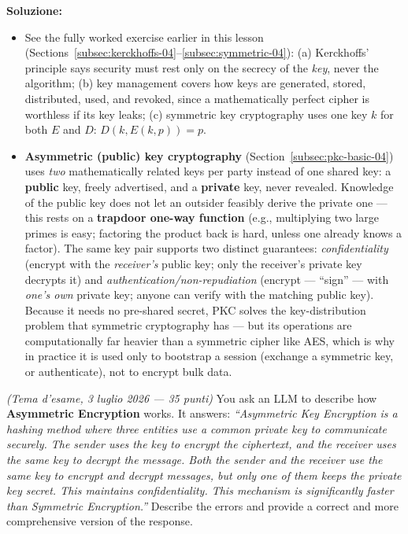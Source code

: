 \documentclass[12pt, a4paper]{article}
\newcounter{esercizio}[section]
\begin{document}
\textbf{Soluzione:}
\begin{itemize}
    \item[(a--c)] See the fully worked exercise earlier in this lesson (Sections~\ref{subsec:kerckhoffs-04}--\ref{subsec:symmetric-04}): (a) Kerckhoffs' principle says security must rest only on the secrecy of the \emph{key}, never the algorithm; (b) key management covers how keys are generated, stored, distributed, used, and revoked, since a mathematically perfect cipher is worthless if its key leaks; (c) symmetric key cryptography uses one key $k$ for both $E$ and $D$: $D(k,E(k,p))=p$.
    \item[(d)] \textbf{Asymmetric (public) key cryptography} (Section~\ref{subsec:pkc-basic-04}) uses \emph{two} mathematically related keys per party instead of one shared key: a \textbf{public} key, freely advertised, and a \textbf{private} key, never revealed. Knowledge of the public key does not let an outsider feasibly derive the private one --- this rests on a \textbf{trapdoor one-way function} (e.g., multiplying two large primes is easy; factoring the product back is hard, unless one already knows a factor). The same key pair supports two distinct guarantees: \emph{confidentiality} (encrypt with the \emph{receiver's} public key; only the receiver's private key decrypts it) and \emph{authentication/non-repudiation} (encrypt --- ``sign'' --- with \emph{one's own} private key; anyone can verify with the matching public key). Because it needs no pre-shared secret, PKC solves the key-distribution problem that symmetric cryptography has --- but its operations are computationally far heavier than a symmetric cipher like AES, which is why in practice it is used only to bootstrap a session (exchange a symmetric key, or authenticate), not to encrypt bulk data.
\end{itemize}

\begin{tcolorbox}[colback=lightergray!10, colframe=tocsec, title=\textbf{Esercizio \theesercizio}]
\textit{(Tema d'esame, 3 luglio 2026 --- 35 punti)} You ask an LLM to describe how \textbf{Asymmetric Encryption} works. It answers: \textit{``Asymmetric Key Encryption is a hashing method where three entities use a common private key to communicate securely. The sender uses the key to encrypt the ciphertext, and the receiver uses the same key to decrypt the message. Both the sender and the receiver use the same key to encrypt and decrypt messages, but only one of them keeps the private key secret. This maintains confidentiality. This mechanism is significantly faster than Symmetric Encryption.''} Describe the errors and provide a correct and more comprehensive version of the response.
\end{tcolorbox}
\end{document}

